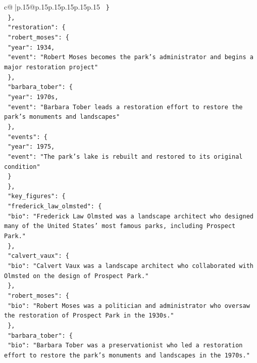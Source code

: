 \documentclass{article}
\begin{document}
{\begin{supertabular}{c@{$\;$}|p{.15\linewidth}@{}p{.15\linewidth}p{.15\linewidth}p{.15\linewidth}p{.15\linewidth}p{.15\linewidth}}
{{{\texttt{      \}} \\
\texttt{    \},} \\
\texttt{    "restoration": \{} \\
\texttt{      "robert\_moses": \{} \\
\texttt{        "year": 1934,} \\
\texttt{        "event": "Robert Moses becomes the park's administrator and begins a major restoration project"} \\
\texttt{      \},} \\
\texttt{      "barbara\_tober": \{} \\
\texttt{        "year": 1970s,} \\
\texttt{        "event": "Barbara Tober leads a restoration effort to restore the park's monuments and landscapes"} \\
\texttt{      \},} \\
\texttt{      "events": \{} \\
\texttt{        "year": 1975,} \\
\texttt{        "event": "The park's lake is rebuilt and restored to its original condition"} \\
\texttt{      \}} \\
\texttt{    \},} \\
\texttt{    "key\_figures": \{} \\
\texttt{      "frederick\_law\_olmsted": \{} \\
\texttt{        "bio": "Frederick Law Olmsted was a landscape architect who designed many of the United States' most famous parks, including Prospect Park."} \\
\texttt{      \},} \\
\texttt{      "calvert\_vaux": \{} \\
\texttt{        "bio": "Calvert Vaux was a landscape architect who collaborated with Olmsted on the design of Prospect Park."} \\
\texttt{      \},} \\
\texttt{      "robert\_moses": \{} \\
\texttt{        "bio": "Robert Moses was a politician and administrator who oversaw the restoration of Prospect Park in the 1930s."} \\
\texttt{      \},} \\
\texttt{      "barbara\_tober": \{} \\
\texttt{        "bio": "Barbara Tober was a preservationist who led a restoration effort to restore the park's monuments and landscapes in the 1970s."} \\
}}}
\end{supertabular}}
\end{document}
